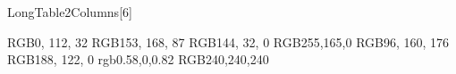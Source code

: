 \newenvironment{LongTableMovable3Columns}[7]
{
\begin{longtable}{#6}
  \caption{#4}%
  \label{tbl:#5} \\

  \toprule
  \textbf{#1} & \textbf{#2} & \textbf{#3} \\
  \midrule
  \endfirsthead

  \multicolumn{3}{c}%
  {{\tablename\ \thetable{} -- continued from previous page}} \\
  \midrule
  \textbf{#1} & \textbf{#2} & \textbf{#3} \\
  \midrule
  \endhead

  \multicolumn{3}{r}{{Continued on next page}} \\
  \midrule
  \endfoot

  \bottomrule
  \endlastfoot

  #7
\end{longtable}
}

\newenvironment{LongTable2Columns}[6]
{
}

\usepackage{tikz}
\usetikzlibrary{
  arrows.meta,
  positioning,
  shapes,
  calc,
  intersections,
  quotes,
  angles,
}
\usepackage{graphicx,tipa,caption}
\usepackage{enumitem}

\definecolor{lstkeyword}  {RGB}{0, 112, 32}
\definecolor{lstkeywordG} {RGB}{153, 168, 87}
\definecolor{lstkeywordR} {RGB}{144, 32, 0}
\definecolor{lstkeywordO} {RGB}{255,165,0}
\definecolor{lstcomment}  {RGB}{96, 160, 176}
\definecolor{lstnumber}   {RGB}{188, 122, 0}
\definecolor{lststring}   {rgb}{0.58,0,0.82}
\definecolor{lstbg}       {RGB}{240,240,240}

